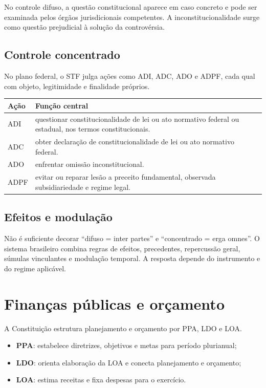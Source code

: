 No controle difuso, a questão constitucional aparece em caso concreto e pode ser examinada pelos órgãos jurisdicionais competentes. A inconstitucionalidade surge como questão prejudicial à solução da controvérsia.

\subsection{Controle concentrado}

No plano federal, o STF julga ações como ADI, ADC, ADO e ADPF, cada qual com objeto, legitimidade e finalidade próprios.

\begin{table}[ht]
\centering
\small
\begin{tabularx}{\textwidth}{l X}
\toprule
Ação & Função central \\
\midrule
ADI & questionar constitucionalidade de lei ou ato normativo federal ou estadual, nos termos constitucionais. \\
ADC & obter declaração de constitucionalidade de lei ou ato normativo federal. \\
ADO & enfrentar omissão inconstitucional. \\
ADPF & evitar ou reparar lesão a preceito fundamental, observada subsidiariedade e regime legal. \\
\bottomrule
\end{tabularx}
\end{table}

\subsection{Efeitos e modulação}

Não é suficiente decorar ``difuso = inter partes'' e ``concentrado = erga omnes''. O sistema brasileiro combina regras de efeitos, precedentes, repercussão geral, súmulas vinculantes e modulação temporal. A resposta depende do instrumento e do regime aplicável.

\section{Finanças públicas e orçamento}

A Constituição estrutura planejamento e orçamento por PPA, LDO e LOA.

\begin{itemize}
\item \textbf{PPA}: estabelece diretrizes, objetivos e metas para período plurianual;
\item \textbf{LDO}: orienta elaboração da LOA e conecta planejamento e orçamento;
\item \textbf{LOA}: estima receitas e fixa despesas para o exercício.
\end{itemize}

